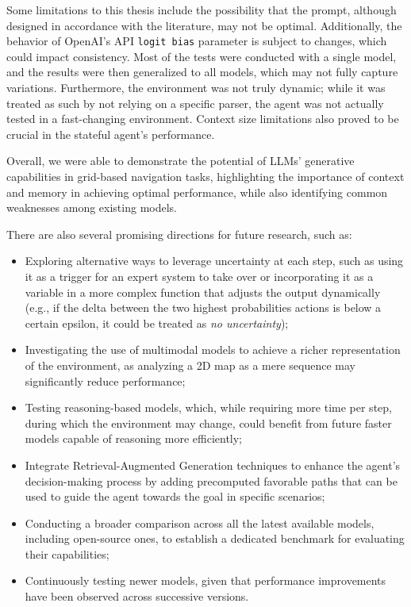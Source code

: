 \vspace{1mm}
Some limitations to this thesis include the possibility that the prompt,
although designed in accordance with the literature, may not be optimal.
Additionally, the behavior of OpenAI's API \texttt{logit bias} parameter is
subject to changes, which could impact consistency. Most of the tests were
conducted with a single model, and the results were then generalized to all models,
which may not fully capture variations. Furthermore, the environment was not
truly dynamic; while it was treated as such by not relying on a specific parser,
the agent was not actually tested in a fast-changing environment. Context size limitations
also proved to be crucial in the stateful agent's performance.
\vspace{1mm}

Overall, we were able to demonstrate the potential of LLMs' generative capabilities
in grid-based navigation tasks, highlighting the importance of context and
memory in achieving optimal performance, while also identifying common weaknesses
among existing models.

There are also several promising directions for future research, such as:

\begin{itemize}
  \item Exploring alternative ways to leverage uncertainty at each step, such as
    using it as a trigger for an expert system to take over or incorporating it
    as a variable in a more complex function that adjusts the output dynamically
    (e.g., if the delta between the two highest probabilities actions is below a
    certain epsilon, it could be treated as \emph{no uncertainty});

  \item Investigating the use of multimodal models to achieve a richer representation
    of the environment, as analyzing a 2D map as a mere sequence may
    significantly reduce performance;

  \item Testing reasoning-based models, which, while requiring more time per step,
    during which the environment may change, could benefit from future faster models
    capable of reasoning more efficiently;

  \item Integrate Retrieval-Augmented Generation techniques to enhance the agent's
    decision-making process by adding precomputed favorable paths that can be used
    to guide the agent towards the goal in specific scenarios;

  \item Conducting a broader comparison across all the latest available models,
    including open-source ones, to establish a dedicated benchmark for evaluating
    their capabilities;

  \item Continuously testing newer models, given that performance improvements
    have been observed across successive versions.
\end{itemize}